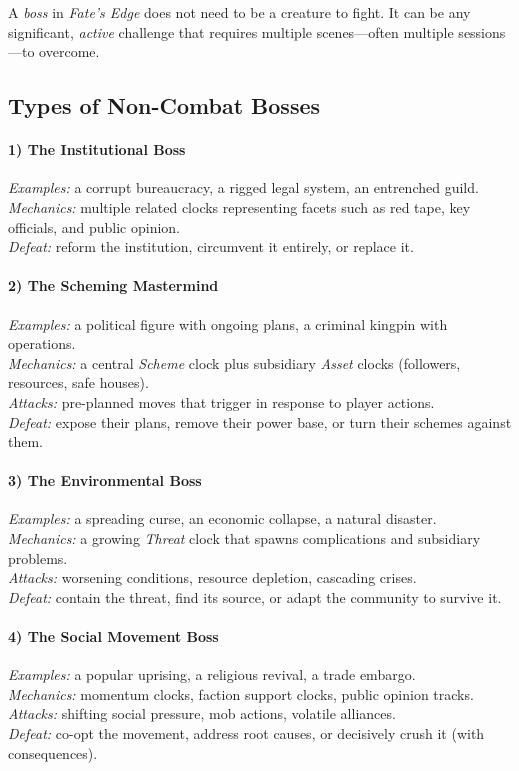 A \emph{boss} in \textit{Fate's Edge} does not need to be a creature to fight. It can be any significant, \emph{active} challenge that requires multiple scenes---often multiple sessions---to overcome.

\subsection*{Types of Non-Combat Bosses}

\paragraph{1) The Institutional Boss}
\textit{Examples:} a corrupt bureaucracy, a rigged legal system, an entrenched guild. \\
\textit{Mechanics:} multiple related clocks representing facets such as red tape, key officials, and public opinion. \\
\textit{Defeat:} reform the institution, circumvent it entirely, or replace it.

\paragraph{2) The Scheming Mastermind}
\textit{Examples:} a political figure with ongoing plans, a criminal kingpin with operations. \\
\textit{Mechanics:} a central \emph{Scheme} clock plus subsidiary \emph{Asset} clocks (followers, resources, safe houses). \\
\textit{Attacks:} pre-planned moves that trigger in response to player actions. \\
\textit{Defeat:} expose their plans, remove their power base, or turn their schemes against them.

\paragraph{3) The Environmental Boss}
\textit{Examples:} a spreading curse, an economic collapse, a natural disaster. \\
\textit{Mechanics:} a growing \emph{Threat} clock that spawns complications and subsidiary problems. \\
\textit{Attacks:} worsening conditions, resource depletion, cascading crises. \\
\textit{Defeat:} contain the threat, find its source, or adapt the community to survive it.

\paragraph{4) The Social Movement Boss}
\textit{Examples:} a popular uprising, a religious revival, a trade embargo. \\
\textit{Mechanics:} momentum clocks, faction support clocks, public opinion tracks. \\
\textit{Attacks:} shifting social pressure, mob actions, volatile alliances. \\
\textit{Defeat:} co-opt the movement, address root causes, or decisively crush it (with consequences).

